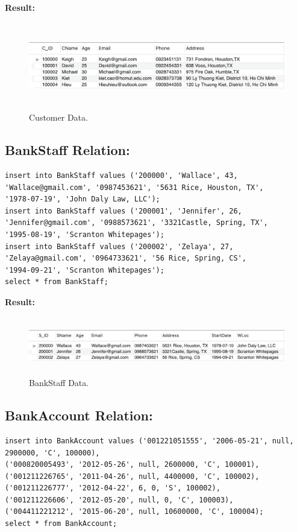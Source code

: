 \documentclass[12pt,a4paper]{article}
\begin{document}
\textbf{Result:}

\begin{figure}[H]
    \centering
    \includegraphics[width=5.5in,height=1.5in]{Picture/CustomerData.png}
    \caption{Customer Data.}
\end{figure}

\subsection{BankStaff Relation:}
\begin{verbatim}
insert into BankStaff values ('200000', 'Wallace', 43,
'Wallace@gmail.com', '0987453621', '5631 Rice, Houston, TX',
'1978-07-19', 'John Daly Law, LLC');
insert into BankStaff values ('200001', 'Jennifer', 26,
'Jennifer@gmail.com', '0988573621', '3321Castle, Spring, TX',
'1995-08-19', 'Scranton Whitepages');
insert into BankStaff values ('200002', 'Zelaya', 27,
'Zelaya@gmail.com', '0964733621', '56 Rice, Spring, CS',
'1994-09-21', 'Scranton Whitepages');
select * from BankStaff;
\end{verbatim}

\textbf{Result:}
\begin{figure}[H]
    \centering
    \includegraphics[width=5.5in,height=1in]{Picture/BankStaffData.png}
    \caption{BankStaff Data.}
\end{figure}

\subsection{BankAccount Relation:}
\begin{verbatim}
insert into BankAccount values ('001221051555', '2006-05-21', null, 
2900000, 'C', 100000), 
('000820005493', '2012-05-26', null, 2600000, 'C', 100001), 
('001211226765', '2011-04-26', null, 4400000, 'C', 100002),
('001211226777', '2012-04-22', 6, 0, 'S', 100002),
('001211226606', '2012-05-20', null, 0, 'C', 100003),
('004411221212', '2015-06-20', null, 10600000, 'C', 100004);
select * from BankAccount;
\end{verbatim}
\end{document}
